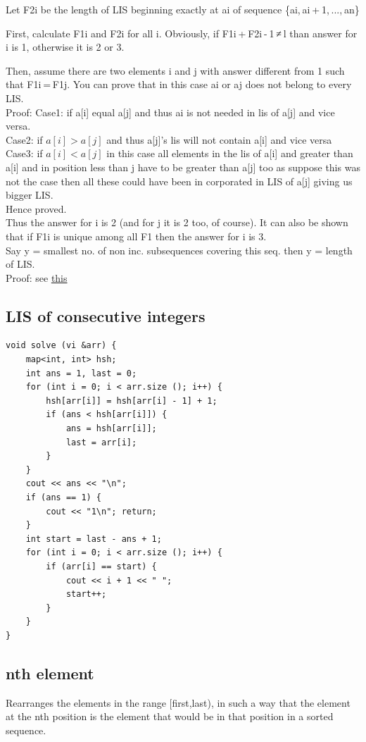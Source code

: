\documentclass[8pt, a4paper, oneside, twocolumn]{extarticle}
\begin{document}
Let F2i be the length of LIS beginning exactly at ai of sequence \{ai, ai + 1, ..., an\}

First, calculate F1i and F2i for all i. Obviously, if F1i + F2i - 1 ≠ l than answer for i is 1, otherwise it is 2 or 3.

Then, assume there are two elements i and j with answer different from 1 such that F1i = F1j. You can prove that in this case ai or aj does not belong to every LIS.
\\Proof: 
Case1: if a[i] equal a[j] and thus ai is not needed in lis of a[j] and vice versa.
\\Case2: if $a[i] > a[j]$ and thus a[j]'s lis will not contain a[i] and vice versa
\\Case3: if $a[i] < a[j]$ in this case all elements in the lis of a[i] and greater than a[i] and in position less than j have to be greater than a[j] too as suppose this was not the case then all these could have been in corporated in LIS of a[j] giving us bigger LIS. 
\\Hence proved. 
\\Thus the answer for i is 2 (and for j it is 2 too, of course). It can also be shown that if F1i is unique among all F1 then the answer for i is 3.
\\Say y = smallest no. of non inc. subsequences covering this seq. then y = length of LIS.
\\Proof: see \href{https://github.com/sourabh2311/Competitive-Programming/blob/master/Reference%20Notes/LIS%20Using%20Segment%20Trees/LongestIncreasingSubsequence.pdf}{this}
\subsection{LIS of consecutive integers}
\begin{verbatim}
void solve (vi &arr) {
    map<int, int> hsh;
    int ans = 1, last = 0;
    for (int i = 0; i < arr.size (); i++) {
        hsh[arr[i]] = hsh[arr[i] - 1] + 1;
        if (ans < hsh[arr[i]]) {
            ans = hsh[arr[i]];
            last = arr[i];
        }
    }
    cout << ans << "\n";
    if (ans == 1) {
        cout << "1\n"; return;
    }
    int start = last - ans + 1;
    for (int i = 0; i < arr.size (); i++) {
        if (arr[i] == start) {
            cout << i + 1 << " ";
            start++;
        }
    }
}
\end{verbatim}
\subsection{nth element}
Rearranges the elements in the range [first,last), in such a way that the element at the nth position is the element that would be in that position in a sorted sequence.
\end{document}
